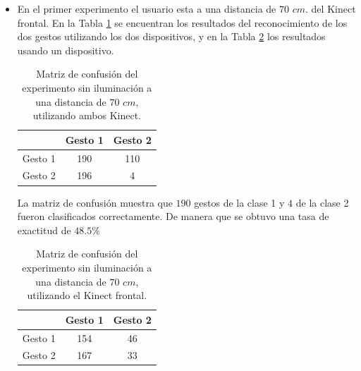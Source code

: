 \begin{itemize}

\item En el primer experimento el usuario esta a una distancia de $70$ $cm.$ del Kinect frontal. En la Tabla \ref{table:70LnoK2} se encuentran los resultados del reconocimiento de los dos gestos utilizando los dos dispositivos, y en la Tabla \ref{table:70LnoK1} los resultados usando un dispositivo.   


\begin{table}[h!] 
\begin{center} 
\caption{Matriz de confusión del experimento sin iluminación a una distancia de $70$ $cm$, utilizando ambos Kinect.} 
\label{table:70LnoK2}
\begin{tabular}{ r || c | c |} 
 
        & Gesto 1 & Gesto 2 \\ \hline \hline  
Gesto 1 & 190     &  110     \\ \hline  
Gesto 2 & 196     &  4     \\   

\end{tabular}
\end{center} 
\end{table}  

La matriz de confusión muestra que $190$ gestos de la clase 1 y $4$ de la clase 2 fueron clasificados correctamente. De manera que se obtuvo una tasa de exactitud de $48.5 \%$ 

\begin{table}[h!] 
\begin{center} 
\caption{Matriz de confusión del experimento sin iluminación a una distancia de $70$ $cm$, utilizando el Kinect frontal.}
\label{table:70LnoK1} 
\begin{tabular}{ r || c | c |} 
        & Gesto 1 & Gesto 2 \\ \hline \hline  
Gesto 1 & 154     &  46     \\ \hline  
Gesto 2 & 167     &  33     \\   
\end{tabular}
\end{center} 
\end{table}  


\end{itemize}
